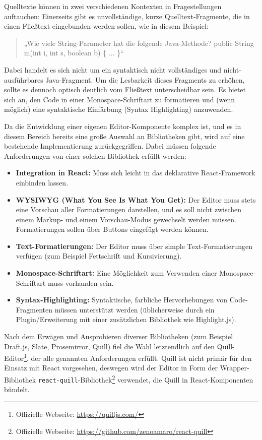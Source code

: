 Quelltexte können in zwei verschiedenen Kontexten in Fragestellungen auftauchen: Einerseits gibt es unvollständige, kurze Quelltext-Fragmente, die in einen Fließtext eingebunden werden sollen, wie in diesem Beispiel:

\begin{quote}
„Wie viele String-Parameter hat die folgende Java-Methode?\newline
public String m(int i, int s, boolean b) \{ ... \}“
\end{quote}

Dabei handelt es sich nicht um ein syntaktisch nicht vollständiges und nicht-ausführbares Java-Fragment. Um die Lesbarkeit dieses Fragments zu erhöhen, sollte es dennoch optisch deutlich vom Fließtext unterscheidbar sein. Es bietet sich an, den Code in einer Monospace-Schriftart zu formatieren und (wenn möglich) eine syntaktische Einfärbung (Syntax Highlighting) anzuwenden.

Da die Entwicklung einer eigenen Editor-Komponente komplex ist, und es in diesem Bereich bereits eine große Auswahl an Bibliotheken gibt, wird auf eine bestehende Implementierung zurückgegriffen. Dabei müssen folgende Anforderungen von einer solchen Bibliothek erfüllt werden:

\begin{itemize}
    \item \textbf{Integration in React:}  Muss sich leicht in das deklarative React-Framework einbinden lassen.
    \item \textbf{WYSIWYG (What You See Is What You Get):} Der Editor muss stets eine Vorschau aller Formatierungen darstellen, und es soll nicht zwischen einem Markup- und einem Vorschau-Modus gewechselt werden müssen. Formatierungen sollen über Buttons eingefügt werden können.
    \item \textbf{Text-Formatierungen:} Der Editor muss über simple Text-Formatierungen verfügen (zum Beispiel Fettschrift und Kursivierung).
    \item \textbf{Monospace-Schriftart:} Eine Möglichkeit zum Verwenden einer Monospace-Schriftart muss vorhanden sein.
    \item \textbf{Syntax-Highlighting:} Syntaktische, farbliche Hervorhebungen von Code-Fragmenten müssen unterstützt werden (üblicherweise durch ein Plugin/Erweiterung mit einer zusätzlichen Bibliothek wie Highlight.js).
\end{itemize}

Nach dem Erwägen und Ausprobieren diverser Bibliotheken (zum Beispiel Draft.js, Slate, Prosemirror, Quill) fiel die Wahl letztendlich auf den Quill-Editor\footnote{Offizielle Webseite: \url{https://quilljs.com/}}, der alle genannten Anforderungen erfüllt. Quill ist nicht primär für den Einsatz mit React vorgesehen, deswegen wird der Editor in Form der Wrapper-Bibliothek \texttt{react-quill}-Bibliothek\footnote{Offizielle Webseite: \url{https://github.com/zenoamaro/react-quill}} verwendet, die Quill in React-Komponenten bündelt.

